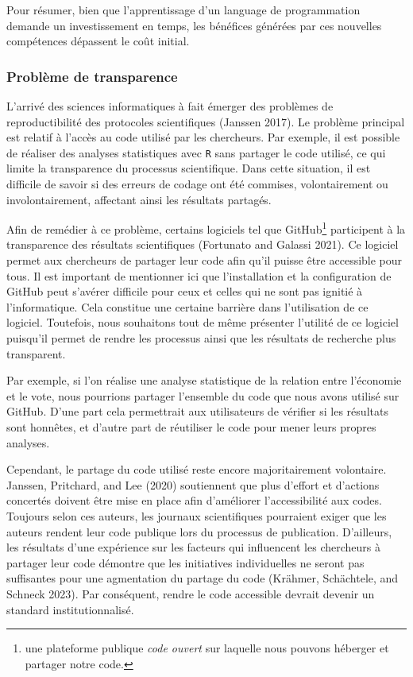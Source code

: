 \documentclass[
  letterpaper,
]{scrbook}
\begin{document}
Pour résumer, bien que l'apprentissage d'un language de programmation
demande un investissement en temps, les bénéfices générées par ces
nouvelles compétences dépassent le coût initial.

\hypertarget{probluxe8me-de-transparence}{%
\subsubsection{Problème de
transparence}\label{probluxe8me-de-transparence}}

L'arrivé des sciences informatiques à fait émerger des problèmes de
reproductibilité des protocoles scientifiques (Janssen 2017). Le
problème principal est relatif à l'accès au code utilisé par les
chercheurs. Par exemple, il est possible de réaliser des analyses
statistiques avec \texttt{R} sans partager le code utilisé, ce qui
limite la transparence du processus scientifique. Dans cette situation,
il est difficile de savoir si des erreurs de codage ont été commises,
volontairement ou involontairement, affectant ainsi les résultats
partagés.

Afin de remédier à ce problème, certains logiciels tel que
GitHub\footnote{une plateforme publique \emph{code ouvert} sur laquelle
  nous pouvons héberger et partager notre code.} participent à la
transparence des résultats scientifiques (Fortunato and Galassi 2021).
Ce logiciel permet aux chercheurs de partager leur code afin qu'il
puisse être accessible pour tous. Il est important de mentionner ici que
l'installation et la configuration de GitHub peut s'avérer difficile
pour ceux et celles qui ne sont pas ignitié à l'informatique. Cela
constitue une certaine barrière dans l'utilisation de ce logiciel.
Toutefois, nous souhaitons tout de même présenter l'utilité de ce
logiciel puisqu'il permet de rendre les processus ainsi que les
résultats de recherche plus transparent.

Par exemple, si l'on réalise une analyse statistique de la relation
entre l'économie et le vote, nous pourrions partager l'ensemble du code
que nous avons utilisé sur GitHub. D'une part cela permettrait aux
utilisateurs de vérifier si les résultats sont honnêtes, et d'autre part
de réutiliser le code pour mener leurs propres analyses.

Cependant, le partage du code utilisé reste encore majoritairement
volontaire. Janssen, Pritchard, and Lee (2020) soutiennent que plus
d'effort et d'actions concertés doivent être mise en place afin
d'améliorer l'accessibilité aux codes. Toujours selon ces auteurs, les
journaux scientifiques pourraient exiger que les auteurs rendent leur
code publique lors du processus de publication. D'ailleurs, les
résultats d'une expérience sur les facteurs qui influencent les
chercheurs à partager leur code démontre que les initiatives
individuelles ne seront pas suffisantes pour une agmentation du partage
du code (Krähmer, Schächtele, and Schneck 2023). Par conséquent, rendre
le code accessible devrait devenir un standard institutionnalisé.
\end{document}
